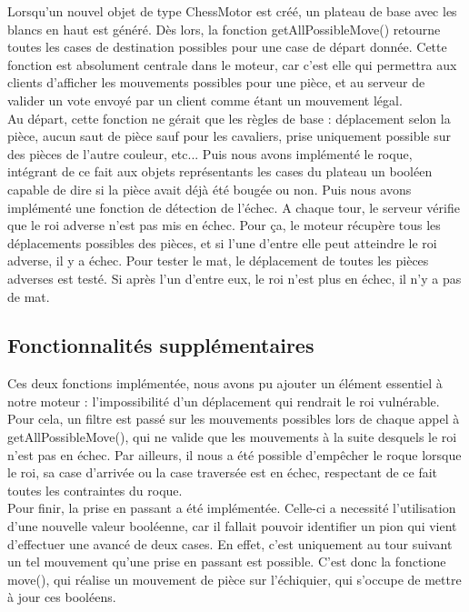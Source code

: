\documentclass{article}
\begin{document}
Lorsqu'un nouvel objet de type ChessMotor est créé, un plateau de base avec les blancs en haut est généré. Dès lors, la fonction getAllPossibleMove() retourne toutes les cases de destination possibles pour une case de départ donnée. Cette fonction est absolument centrale dans le moteur, car c'est elle qui permettra aux clients d'afficher les mouvements possibles pour une pièce, et au serveur de valider un vote envoyé par un client comme étant un mouvement légal.\\
Au départ, cette fonction ne gérait que les règles de base : déplacement selon la pièce, aucun saut de pièce sauf pour les cavaliers, prise uniquement possible sur des pièces de l'autre couleur, etc... Puis nous avons implémenté le roque, intégrant de ce fait aux objets représentants les cases du plateau un booléen capable de dire si la pièce avait déjà été bougée ou non. Puis nous avons implémenté une fonction de détection de l'échec. A chaque tour, le serveur vérifie que le roi adverse n'est pas mis en échec. Pour ça, le moteur récupère tous les déplacements possibles des pièces, et si l'une d'entre elle peut atteindre le roi adverse, il y a échec. Pour tester le mat, le déplacement de toutes les pièces adverses est testé. Si après l'un d'entre eux, le roi n'est plus en échec, il n'y a pas de mat.
\subsection{Fonctionnalités supplémentaires}
Ces deux fonctions implémentée, nous avons pu ajouter un élément essentiel à notre moteur : l'impossibilité d'un déplacement qui rendrait le roi vulnérable. Pour cela, un filtre est passé sur les mouvements possibles lors de chaque appel à getAllPossibleMove(), qui ne valide que les mouvements à la suite desquels le roi n'est pas en échec. Par ailleurs, il nous a été possible d'empêcher le roque lorsque le roi, sa case d'arrivée ou la case traversée est en échec, respectant de ce fait toutes les contraintes du roque.\\

Pour finir, la prise en passant a été implémentée. Celle-ci a necessité l'utilisation d'une nouvelle valeur booléenne, car il fallait pouvoir identifier un pion qui vient d'effectuer une avancé de deux cases. En effet, c'est uniquement au tour suivant un tel mouvement qu'une prise en passant est possible. C'est donc la fonctione move(), qui réalise un mouvement de pièce sur l'échiquier, qui s'occupe de mettre à jour ces booléens.
\end{document}

